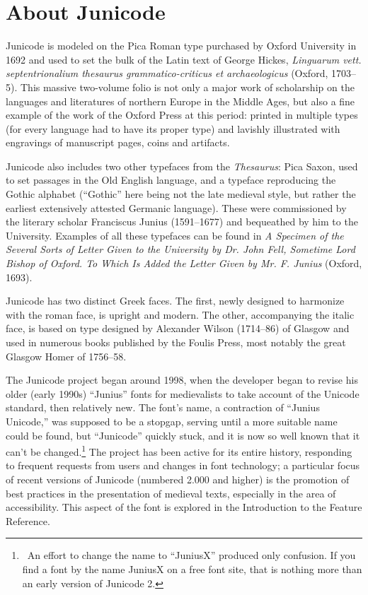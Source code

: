 
\hypertarget{aboutj}{}\chapter{About Junicode}

{\large%
\noindent Junicode is modeled on the Pica Roman type
purchased by Oxford University in 1692 and
used to set the bulk of the Latin text of George Hickes,
{\itshape Linguarum vett. septentrionalium thesaurus
grammatico-criticus et archaeologicus} (Oxford, 1703–5). This massive two-volume folio
is not only a major work of scholarship on the languages and literatures
of northern Europe in the Middle Ages, but also a fine
example of the work of the Oxford Press at this
period: printed in multiple types (for every language had to
have its proper type) and lavishly
illustrated with engravings of manuscript pages, coins and
artifacts.

Junicode also includes two other typefaces from the \textit{Thesaurus}:
Pica Saxon, used to set passages in the Old English language,
and a typeface reproducing the Gothic alphabet (“Gothic” here
being not the late medieval style, but rather
the earliest extensively attested Germanic language).
These were commissioned by the literary scholar
Francis\-cus Junius (1591–1677) and bequeathed by him to
the University. Examples of all these typefaces can be found
in {\itshape A Specimen of the
Several Sorts of Letter Given to the University by Dr. John Fell,
Sometime Lord Bishop of Oxford. To Which Is Added the Letter Given by
Mr. F. Junius} (Oxford, 1693).

Junicode has two distinct Greek faces. The first, newly designed to harmonize with the roman face, is
up\-right and modern. The other, accompanying the italic face, is based on type designed by Alexander
Wilson (1714–86) of Glasgow and used in numerous books published by
the Foulis Press, most notably the great Glasgow Homer of 1756–58.

The Junicode project began around 1998, when the developer began to revise his
older (early 1990s) “Junius” fonts for medievalists to take account of the Unicode
standard, then relatively new. The font’s name, a contraction of
“Junius Unicode,” was supposed to be a stopgap, serving until a more suitable name
could be found, but “Junicode” quickly stuck, and it is now so well known that it can’t be
changed.\footnote{\ An effort to change the name to “JuniusX” produced
only confusion. If you find a font by the name JuniusX on a free font site,
that is nothing more than an early version of Junicode 2.}
The project has been active for its entire history, responding to frequent
requests from users and changes in font technology; a particular focus of
recent versions of Junicode (numbered 2.000 and higher) is the promotion of best practices in the presentation
of medieval texts, especially in
the area of accessibility. This aspect of the font is explored in the
Introduction to the Feature Reference.

}
\pagestyle{fancy}
